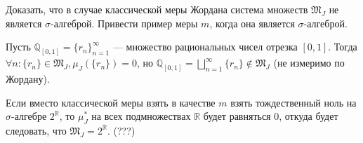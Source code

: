 \begin{task}{5}
  Доказать, что в случае классической меры Жордана система множеств $\mathfrak{M}_J$ не
  является $\sigma$-алгеброй. Привести пример меры $m$, когда она является $\sigma$-алгеброй.
\end{task}

\begin{solution}
  Пусть $\mathbb{Q}_{[0,1]} = \{ r_n \}_{n=1}^{\infty}$ --- множество рациональных чисел
  отрезка $[0,1]$. Тогда $\forall n: \{ r_n\} \in \mathfrak{M}_J, \mu_J (\{ r_n \}) = 0$, но 
  $\mathbb{Q}_{[0,1]} = \bigsqcup\limits_{n = 1}^{\infty} \{ r_n \} \not\in \mathfrak{M}_J$ (не измеримо по Жордану).
  
  Если вместо классической меры взять в качестве $m$ взять тождественный ноль на $\sigma$-алгебре $2^\mathbb{R}$, то $\mu_J^*$ на
  всех подмножествах $\mathbb{R}$ будет равняться $0$, откуда будет следовать, что $\mathfrak{M}_J = 2^{\mathbb{R}}$. (???)
\end{solution}